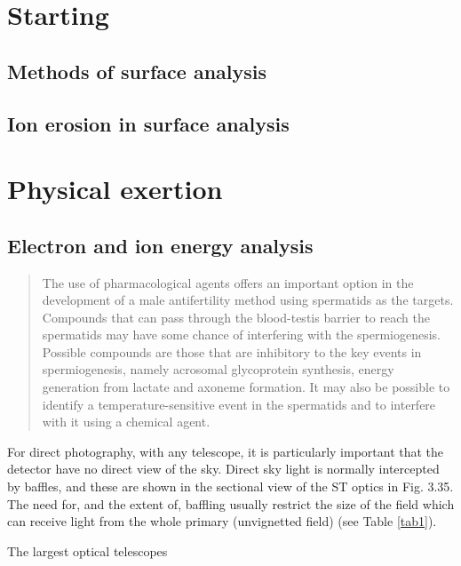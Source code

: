 \cleardoublepage
{}
\part{Starting} %

\author[J. M. Walls]{J. M. WALLS\\Affiliation}
\chapter{Methods of surface analysis} %

\author[R. Smith and J. M. Walls]
       {R. SMITH \\ Affiliation of R. Smith \and J.\,M. WALLS \\
        Affiliation of J. M. Walls}
\chapter{Ion erosion in surface analysis} %

\part{Physical exertion} %

\author[M. P. Seah]{M. P. SEAH\\University of Cambridge}
\chapter{Electron and ion energy analysis} %
\setcounter{equation}{7}

\begin{abstract}
 The use of pharmacological agents offers an important option in the
development of a male antifertility method using spermatids as the
targets. Compounds that can pass through the blood-testis barrier to
reach the spermatids may have some chance of interfering with the
spermiogenesis. Possible compounds are those that are inhibitory to the
key events in spermiogenesis, namely acrosomal glycoprotein synthesis,
energy generation from lactate and axoneme formation. It may also be
possible to identify a temperature-sensitive event in the spermatids
and to interfere with it using a chemical agent.
 \end{abstract}
 For direct photography, with any telescope, it is particularly
important that the detector have no direct view of the sky. Direct sky
light is normally intercepted by baffles, and these are shown in the
sectional view of the ST optics in Fig. 3.35. The need for, and the
extent of, baffling usually restrict the size of the field which can
receive light from the whole primary (unvignetted field) (see Table
\ref{tab1}).
\begin{table*}
 \caption{The largest optical telescopes}
 \label{tab1}
 \vspace*{500pt}
\end{table*}

